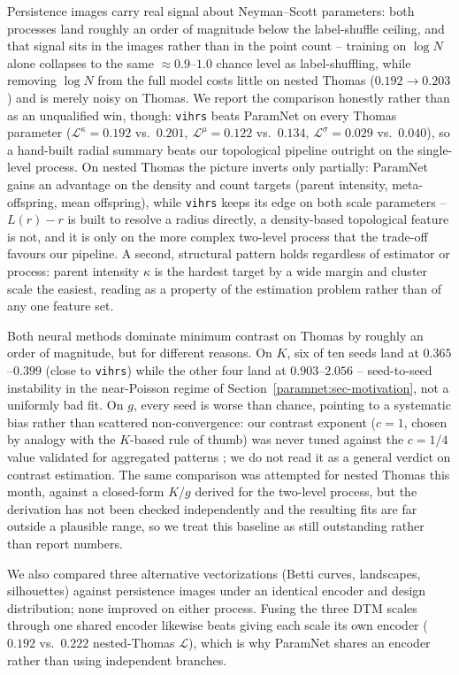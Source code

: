 \documentclass[11pt,a4paper]{article}
\theoremstyle{definitioncolon}
\begin{document}
Persistence images carry real signal about Neyman--Scott parameters: both
processes land roughly an order of magnitude below the label-shuffle
ceiling, and that signal sits in the images rather than in the point count
-- training on $\log N$ alone collapses to the same $\approx\!0.9$--$1.0$
chance level as label-shuffling, while removing $\log N$ from the full
model costs little on nested Thomas ($0.192\rightarrow0.203$) and is merely
noisy on Thomas. We report the comparison honestly rather than as an
unqualified win, though: \texttt{vihrs} beats ParamNet on every Thomas
parameter ($\mathcal{L}^\kappa=0.192$ vs.\ $0.201$, $\mathcal{L}^\mu=0.122$
vs.\ $0.134$, $\mathcal{L}^\sigma=0.029$ vs.\ $0.040$), so a hand-built
radial summary beats our topological pipeline outright on the single-level
process. On nested Thomas the picture inverts only partially: ParamNet
gains an advantage on the density and count targets (parent intensity,
meta-offspring, mean offspring), while \texttt{vihrs} keeps its edge on
both scale parameters -- $L(r)-r$ is built to resolve a radius directly, a
density-based topological feature is not, and it is only on the more
complex two-level process that the trade-off favours our pipeline. A
second, structural pattern holds regardless of estimator or process: parent
intensity $\kappa$ is the hardest target by a wide margin and cluster scale
the easiest, reading as a property of the estimation problem rather than of
any one feature set.

Both neural methods dominate minimum contrast on Thomas by roughly an order
of magnitude, but for different reasons. On $K$, six of ten seeds land at
$0.365$--$0.399$ (close to \texttt{vihrs}) while the other four land at
$0.903$--$2.056$ -- seed-to-seed instability in the near-Poisson regime of
Section~\ref{paramnet:sec-motivation}, not a uniformly bad fit. On $g$,
every seed is worse than chance, pointing to a systematic bias rather than
scattered non-convergence: our contrast exponent ($c=1$, chosen by analogy
with the $K$-based rule of thumb) was never tuned against the $c=1/4$ value
validated for aggregated patterns \citep{diggle2003spatial}; we do not read
it as a general verdict on contrast estimation. The same comparison was
attempted for nested Thomas this month, against a closed-form $K$/$g$
derived for the two-level process, but the derivation has not been checked
independently and the resulting fits are far outside a plausible range, so
we treat this baseline as still outstanding rather than report numbers.

We also compared three alternative vectorizations (Betti curves,
landscapes, silhouettes) against persistence images under an identical
encoder and design distribution; none improved on either process. Fusing
the three DTM scales through one shared encoder likewise beats giving each
scale its own encoder ($0.192$ vs.\ $0.222$ nested-Thomas $\mathcal{L}$),
which is why ParamNet shares an encoder rather than using independent
branches.
\end{document}
